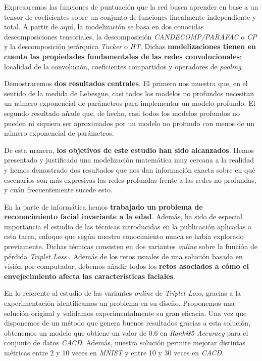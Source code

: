 Expresaremos las funciones de puntuación que la red busca aprender en base a un tensor de coeficientes sobre un conjunto de funciones linealmente independiente y total. A partir de aquí, la modelización se basa en dos conocidas descomposiciones tensoriales, la descomposición \textit{CANDECOMP/PARAFAC} o \textit{CP} y la descomposición jerárquica \textit{Tucker} o \textit{HT}. Dichas \textbf{modelizaciones tienen en cuenta las propiedades fundamentales de las redes convolucionales}: localidad de la convolución, coeficientes compartidos y operadores de \textit{pooling}.

Demostraremos \textbf{dos resultados centrales}. El primero nos muestra que, en el sentido de la medida de Lebesgue, casi todos los modelos no profundos necesitan un número exponencial de parámetros para implementar un modelo profundo. El segundo resultado añade que, de hecho, casi todos los modelos profundos no pueden ni siquiera ser aproximados por un modelo no profundo con menos de un número exponencial de parámetros.

De esta manera, \textbf{los objetivos de este estudio han sido alcanzados}. Hemos presentado y justificado una modelización matemática muy cercana a la realidad y hemos demostrado dos resultados que nos dan información exacta sobre en qué escenarios son más expresivas las redes profundas frente a las redes no profundas, y cuán frecuentemente sucede esto.

En la parte de informática hemos \textbf{trabajado un problema de reconocimiento facial invariante a la edad}. Además, ha sido de especial importancia el estudio de las técnicas introducidas en la publicación \cite{informatica:principal} aplicadas a esta tarea, enfoque que según nuestro conocimiento nunca se había explorado previamente. Dichas técnicas consisten en dos variantes \textit{online} sobre la función de pérdida \textit{Triplet Loss} \cite{informatica:principal}.  Además de los retos usuales de una solución basada en visión por computador, debemos añadir todos los \textbf{retos asociados a cómo el envejecimiento afecta las características faciales}.

En lo referente al estudio de las variantes \textit{online} de \textit{Triplet Loss}, gracias a la experimentación identificamos un problema en su diseño. Proponemos una solución original y validamos experimentalmente su gran eficacia. Una vez que disponemos de un método que genera buenos resultados gracias a esta solución, obtenemos un modelo que obtiene un valor de 0.6 en \textit{Rank@5 Accuracy} para el conjunto de datos \textit{CACD}. Además, nuestra solución permite mejorar distintas métricas entre 2 y 10 veces en \textit{MNIST} y entre 10 y 30 veces en \textit{CACD}.

